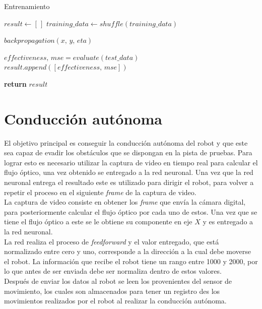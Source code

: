 \documentclass{iccmemoria}
\begin{document}
\begin{algorithm}[H]
\caption{Entrenamiento}\label{alg:training}
\begin{algorithmic}[1]
\State $result \gets [\,]$
\State $training\_data \gets shuffle(training\_data)$

	\State $backpropagation(x,\, y,\, eta)$
\EndFor

\State $effectiveness,\, mse = evaluate(test\_data)$
\State $result.append([effectiveness,\, mse])$
\EndFor

\State \textbf{return} $result$
\EndFunction
\end{algorithmic}
\end{algorithm}

\section{Conducción autónoma}

El objetivo principal es conseguir la conducción autónoma del robot y que este sea capaz de evadir los obstáculos que se dispongan en la pista de pruebas. Para lograr esto es necesario utilizar la captura de video en tiempo real para calcular el flujo óptico, una vez obtenido se entregado a la red neuronal. Una vez que la red neuronal entrega el resultado este es utilizado para dirigir el robot, para volver a repetir el proceso en el siguiente \emph{frame} de la captura de video.\\

La captura de video consiste en obtener los \emph{frame} que envía la cámara digital, para posteriormente calcular el flujo óptico por cada uno de estos. Una vez que se tiene el flujo óptico a este se le obtiene su componente en eje $X$ y es entregado a la red neuronal.\\

La red realiza el proceso de \emph{feedforward} y el valor entregado, que está normalizado entre cero y uno, corresponde a la dirección a la cual debe moverse el robot. La información que recibe el robot tiene un rango entre 1000 y 2000, por lo que antes de ser enviada debe ser normaliza dentro de estos valores.\\

Después de enviar los datos al robot se leen los provenientes del sensor de movimiento, los cuales son almacenados para tener un registro des los movimientos realizados por el robot al realizar la conducción autónoma.\\
\end{document}
